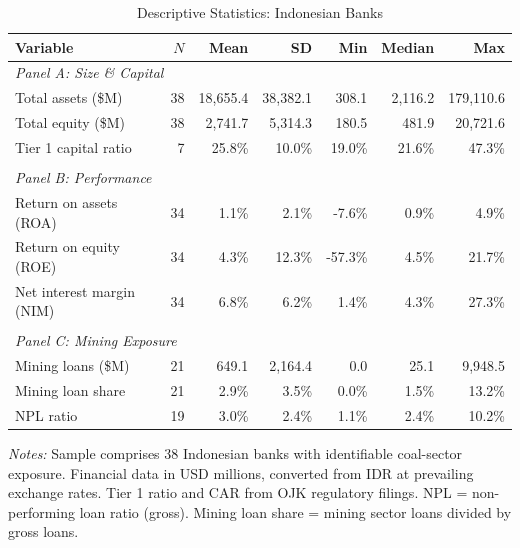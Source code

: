 \begin{table}[htbp]
\centering
\caption{Descriptive Statistics: Indonesian Banks}
\label{tab:bank_desc}
\footnotesize
\begin{tabular}{lrrrrrr}
\toprule
Variable & $N$ & Mean & SD & Min & Median & Max \\
\midrule
\multicolumn{7}{l}{\textit{Panel A: Size \& Capital}} \\[2pt]
  Total assets (\$M) & 38 & 18,655.4 & 38,382.1 & 308.1 & 2,116.2 & 179,110.6 \\
  Total equity (\$M) & 38 & 2,741.7 & 5,314.3 & 180.5 & 481.9 & 20,721.6 \\
  Tier 1 capital ratio & 7 & 25.8\% & 10.0\% & 19.0\% & 21.6\% & 47.3\% \\
\\[4pt]
\multicolumn{7}{l}{\textit{Panel B: Performance}} \\[2pt]
  Return on assets (ROA) & 34 & 1.1\% & 2.1\% & -7.6\% & 0.9\% & 4.9\% \\
  Return on equity (ROE) & 34 & 4.3\% & 12.3\% & -57.3\% & 4.5\% & 21.7\% \\
  Net interest margin (NIM) & 34 & 6.8\% & 6.2\% & 1.4\% & 4.3\% & 27.3\% \\
\\[4pt]
\multicolumn{7}{l}{\textit{Panel C: Mining Exposure}} \\[2pt]
  Mining loans (\$M) & 21 & 649.1 & 2,164.4 & 0.0 & 25.1 & 9,948.5 \\
  Mining loan share & 21 & 2.9\% & 3.5\% & 0.0\% & 1.5\% & 13.2\% \\
  NPL ratio & 19 & 3.0\% & 2.4\% & 1.1\% & 2.4\% & 10.2\% \\
\bottomrule
\end{tabular}

\smallskip
\noindent \textit{Notes:} Sample comprises 38 Indonesian banks with identifiable coal-sector exposure. Financial data in USD millions, converted from IDR at prevailing exchange rates. Tier 1 ratio and CAR from OJK regulatory filings. NPL = non-performing loan ratio (gross). Mining loan share = mining sector loans divided by gross loans.
\end{table}
